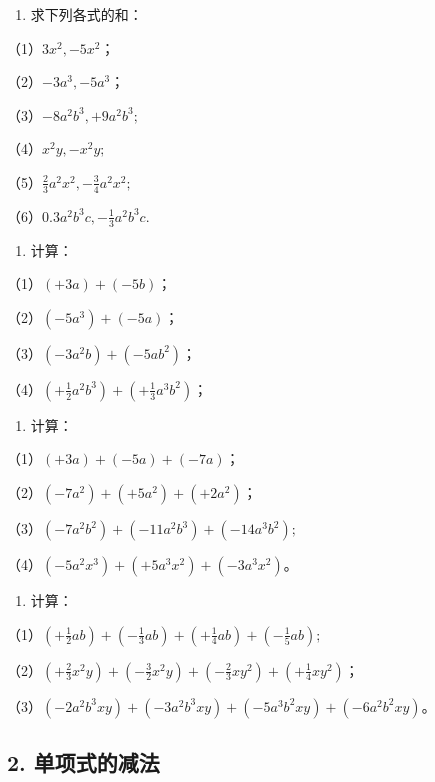 \begin{enumerate}[start=2]
\item
  求下列各式的和：
\end{enumerate}

（1）\(3x^{2}, -5x^{2}\)；

（2）\(-3a^{3}, -5a^{3}\)；

（3）\(-8a^{2}b^{3}, + 9a^{2}b^{3};\)

（4）\(x^{2}y, - x^{2}y;\)

（5）\(\frac{2}{3} a^2 x^2, -\frac{3}{4} a^2 x^2;\)

（6）\(0.3a^{2}b^{3}c, -\frac{1}{3} a^{2}b^{3}c.\)

\begin{enumerate}[start=3]
\item
  计算：
\end{enumerate}

（1）\((+3a) + (-5b)\)；

（2）\((-5a^{3}) + (-5a)\)；

（3）\((-3a^{2}b) + (-5ab^{2})\)；

（4）\(\left(+\frac{1}{2} a^2 b^3\right) + \left(+\frac{1}{3} a^3 b^2\right)\)；

\begin{enumerate}[start=4]
\item
  计算：
\end{enumerate}

（1）\((+3a) + (-5a) + (-7a)\)；

（2）\((-7a^{2}) + (+5a^{2}) + (+2a^{2})\)；

（3）\((-7a^{2}b^{2}) + (-11a^{2}b^{3}) + (-14a^{3}b^{2});\)

（4）\((-5a^{2}x^{3}) + (+5a^{3}x^{2}) + (-3a^{3}x^{2})\)。

\begin{enumerate}[start=5]
\item
  计算：
\end{enumerate}

（1）\(\left(+\frac{1}{2} ab\right)+\left(-\frac{1}{3} ab\right)+\left(+\frac{1}{4} ab\right)+\left(-\frac{1}{5} ab\right);\)

（2）\(\left(+\frac{2}{3} x^2 y\right) + \left(-\frac{3}{2} x^2 y\right) + \left(-\frac{2}{3} xy^2\right) + \left(+\frac{1}{4} xy^2\right)\)；

（3）\((-2a^2 b^3 xy) + (-3a^2 b^3 xy) + (-5a^3 b^2 xy) + (-6a^2 b^2 xy)\)。

\subsection{2. 单项式的减法}

